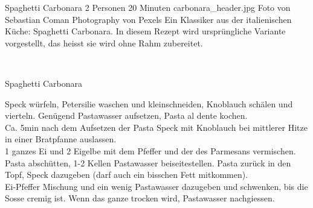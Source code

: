\begin{myrecipe}
    {Spaghetti Carbonara}
    {2 Personen}
    {20 Minuten}
    {carbonara_header.jpg}
    {Foto von Sebastian Coman Photography von Pexels}
    \freeform
    \large Ein Klassiker aus der italienischen Küche: Spaghetti Carbonara. In diesem Rezept wird ursprüngliche Variante vorgestellt, das heisst sie wird ohne Rahm zubereitet.
    \freeform
    \newpage

    \freeform
    \mbox{}\\[-\baselineskip]%
    \parbox[b]{\textwidth}{%
    \rule{0pt}{\baselineskip}%
    \strut{\recipetitlefont Spaghetti Carbonara}\strut\hfill}%

    Speck würfeln, Petersilie waschen und kleinschneiden, Knoblauch schälen und vierteln.
    Genügend Pastawasser aufsetzen, Pasta al dente kochen.
    \freeform
    \\Ca. 5min nach dem Aufsetzen der Pasta Speck mit Knoblauch bei mittlerer Hitze in einer Bratpfanne auslassen.\\
    1 ganzes Ei und 2 Eigelbe mit dem Pfeffer und der  des Parmesans vermischen.
    \freeform
    \\Pasta abschütten, 1-2 Kellen Pastawasser beiseitestellen. Pasta zurück in den Topf, Speck dazugeben (darf auch ein bisschen Fett mitkommen).\\
    Ei-Pfeffer Mischung und ein wenig Pastawasser dazugeben und schwenken, bis die Sosse cremig ist. Wenn das ganze trocken wird, Pastawasser nachgiessen.
\end{myrecipe}
\clearpage